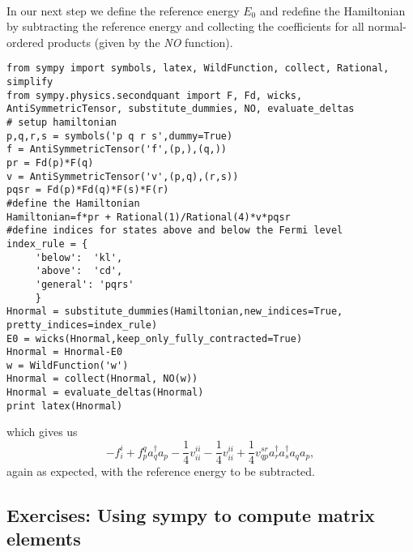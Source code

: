 \documentclass[%
twoside,                 %
final,                   %
10pt]{article}
\begin{document}
\paragraph{}
In our next step we define the reference energy $E_0$ and redefine the Hamiltonian by subtracting the reference energy and collecting the coefficients for all normal-ordered products (given by the \emph{NO} function).
\begin{verbatim}
from sympy import symbols, latex, WildFunction, collect, Rational, simplify
from sympy.physics.secondquant import F, Fd, wicks, AntiSymmetricTensor, substitute_dummies, NO, evaluate_deltas
# setup hamiltonian
p,q,r,s = symbols('p q r s',dummy=True)
f = AntiSymmetricTensor('f',(p,),(q,))
pr = Fd(p)*F(q)
v = AntiSymmetricTensor('v',(p,q),(r,s))
pqsr = Fd(p)*Fd(q)*F(s)*F(r)
#define the Hamiltonian
Hamiltonian=f*pr + Rational(1)/Rational(4)*v*pqsr
#define indices for states above and below the Fermi level
index_rule = {
     'below':  'kl',
     'above':  'cd',
     'general': 'pqrs'
     }
Hnormal = substitute_dummies(Hamiltonian,new_indices=True, pretty_indices=index_rule)
E0 = wicks(Hnormal,keep_only_fully_contracted=True)
Hnormal = Hnormal-E0
w = WildFunction('w')
Hnormal = collect(Hnormal, NO(w))
Hnormal = evaluate_deltas(Hnormal)
print latex(Hnormal)
\end{verbatim}
which gives us 
\[
- f^{i}_{i} + f^{q}_{p} a^\dagger_{q} a_{p} - \frac{1}{4} v^{ii}_{ii} - \frac{1}{4} v^{ii}_{ii} + \frac{1}{4} v^{sr}_{qp} a^\dagger_{r} a^\dagger_{s} a_{q} a_{p},
\]
again as expected, with the reference energy to be subtracted.




\subsection*{Exercises: Using sympy to compute matrix elements}

\end{document}
